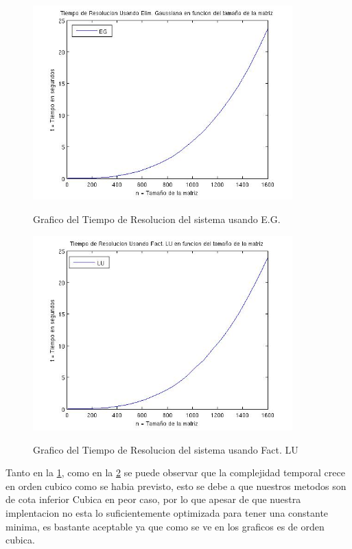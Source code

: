 \documentclass[12pt,a4paper]{article}
\begin{document}
\begin{figure}[h!]
\centering
\caption{Grafico del Tiempo de Resolucion del sistema usando E.G.}
\includegraphics[width=10cm]{CTemporalEG.jpg}
\label{Exp1EG}
\end{figure}

\begin{figure}[h!]
\centering
\caption{Grafico del Tiempo de Resolucion del sistema usando Fact. LU}
\includegraphics[width=10cm]{CTemporalLU.jpg}
\label{Exp1LU}
\end{figure}

Tanto en la \ref{Exp1EG}, como en la \ref{Exp1LU} se puede observar que la complejidad temporal crece en orden cubico como se habia previsto, esto se debe a que nuestros metodos son de cota inferior Cubica en peor caso, por lo que apesar de que nuestra implentacion no esta lo suficientemente optimizada para tener una constante minima, es bastante aceptable ya que como se ve en los graficos es de orden cubica.
\end{document}
